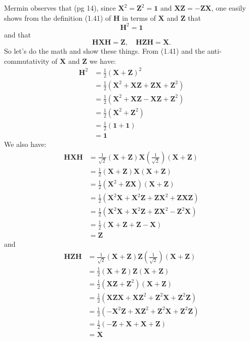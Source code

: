 \documentclass{article}
\begin{document}
Mermin observes that (pg 14), since $\bm{X}^2 = \bm{Z}^2 = \bm{1}$ and $\bm{X}\bm{Z} = -\bm{Z}\bm{X}$, one easily shows from the definition (1.41) of $\bm{H}$ in terms of $\bm{X}$ and $\bm{Z}$ that
\[\tag{1.42}
\bm{H}^2 = \bm{1}
\]
and that
\[\tag{1.43}
\bm{H}\bm{X}\bm{H} = \bm{Z},\quad\bm{H}\bm{Z}\bm{H} = \bm{X}.
\]
So let's do the math and show these things. From (1.41) and the anti-commutativity of $\bm{X}$ and $\bm{Z}$ we have:
\begin{align*}
    \bm{H}^2
    &= \frac{1}{2}(\bm{X} + \bm{Z})^2\\
    &= \frac{1}{2}(\bm{X}^2 + \bm{X}\bm{Z} + \bm{Z}\bm{X} +  \bm{Z}^2)\\
    &= \frac{1}{2}(\bm{X}^2 + \bm{X}\bm{Z} - \bm{X}\bm{Z} +  \bm{Z}^2)\\
    &= \frac{1}{2}(\bm{X}^2 + \bm{Z}^2)\\
    &= \frac{1}{2}(\bm{1} + \bm{1})\\
    &= \bm{1}
\end{align*}
We also have:
\begin{align*}
    \bm{H}\bm{X}\bm{H}
    &= \frac{1}{\sqrt{2}}(\bm{X} + \bm{Z})\bm{X}(\frac{1}{\sqrt{2}})(\bm{X} + \bm{Z})\\
    &= \frac{1}{2}(\bm{X} + \bm{Z})\bm{X}(\bm{X} + \bm{Z})\\
    &= \frac{1}{2}(\bm{X}^2 + \bm{Z}\bm{X})(\bm{X} + \bm{Z})\\
    &= \frac{1}{2}(\bm{X}^2\bm{X} + \bm{X}^2\bm{Z} + \bm{Z}\bm{X}^2 + \bm{Z}\bm{X}\bm{Z})\\
    &= \frac{1}{2}(\bm{X}^2\bm{X} + \bm{X}^2\bm{Z} + \bm{Z}\bm{X}^2 - \bm{Z}^2\bm{X})\\
    &= \frac{1}{2}(\bm{X} + \bm{Z} + \bm{Z} - \bm{X})\\
    &= \bm{Z}
\end{align*}
and
\begin{align*}
    \bm{H}\bm{Z}\bm{H}
    &= \frac{1}{\sqrt{2}}(\bm{X} + \bm{Z})\bm{Z}(\frac{1}{\sqrt{2}})(\bm{X} + \bm{Z})\\
    &= \frac{1}{2}(\bm{X} + \bm{Z})\bm{Z}(\bm{X} + \bm{Z})\\
    &= \frac{1}{2}(\bm{X}\bm{Z} + \bm{Z}^2)(\bm{X} + \bm{Z})\\
    &= \frac{1}{2}(\bm{X}\bm{Z}\bm{X} + \bm{X}\bm{Z}^2 + \bm{Z}^2\bm{X} + \bm{Z}^2\bm{Z})\\
    &= \frac{1}{2}(-\bm{X}^2\bm{Z} + \bm{X}\bm{Z}^2 + \bm{Z}^2\bm{X} + \bm{Z}^2\bm{Z})\\
    &= \frac{1}{2}(-\bm{Z} + \bm{X} + \bm{X} + \bm{Z})\\
    &= \bm{X}
\end{align*}
\end{document}
